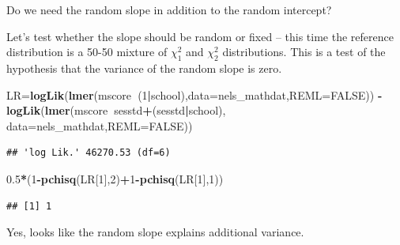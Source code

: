 \documentclass[ignorenonframetext,]{beamer}
\newenvironment{Shaded}{\begin{snugshade}}{\end{snugshade}}
\newcommand{\KeywordTok}[1]{\textcolor[rgb]{0.13,0.29,0.53}{\textbf{#1}}}
\newcommand{\DataTypeTok}[1]{\textcolor[rgb]{0.13,0.29,0.53}{#1}}
\newcommand{\DecValTok}[1]{\textcolor[rgb]{0.00,0.00,0.81}{#1}}
\newcommand{\FloatTok}[1]{\textcolor[rgb]{0.00,0.00,0.81}{#1}}
\newcommand{\OtherTok}[1]{\textcolor[rgb]{0.56,0.35,0.01}{#1}}
\newcommand{\OperatorTok}[1]{\textcolor[rgb]{0.81,0.36,0.00}{\textbf{#1}}}
\newcommand{\NormalTok}[1]{#1}
\begin{document}
\begin{frame}[fragile]{Do we need the random slope in addition to the
random intercept?}

Let's test whether the slope should be random or fixed -- this time the
reference distribution is a 50-50 mixture of \(\chi^2_1\) and
\(\chi^2_2\) distributions. This is a test of the hypothesis that the
variance of the random slope is zero.

\begin{Shaded}
\begin{Highlighting}[]
\NormalTok{LR=}\KeywordTok{logLik}\NormalTok{(}\KeywordTok{lmer}\NormalTok{(mscore}\OperatorTok{~}\NormalTok{(}\DecValTok{1}\OperatorTok{|}\NormalTok{school),}\DataTypeTok{data=}\NormalTok{nels_mathdat,}\DataTypeTok{REML=}\OtherTok{FALSE}\NormalTok{))}
 \OperatorTok{-}\KeywordTok{logLik}\NormalTok{(}\KeywordTok{lmer}\NormalTok{(mscore}\OperatorTok{~}\NormalTok{sesstd}\OperatorTok{+}\NormalTok{(sesstd}\OperatorTok{|}\NormalTok{school),}
              \DataTypeTok{data=}\NormalTok{nels_mathdat,}\DataTypeTok{REML=}\OtherTok{FALSE}\NormalTok{))}
\end{Highlighting}
\end{Shaded}

\begin{verbatim}
## 'log Lik.' 46270.53 (df=6)
\end{verbatim}

\begin{Shaded}
\begin{Highlighting}[]
\FloatTok{0.5}\OperatorTok{*}\NormalTok{(}\DecValTok{1}\OperatorTok{-}\KeywordTok{pchisq}\NormalTok{(LR[}\DecValTok{1}\NormalTok{],}\DecValTok{2}\NormalTok{)}\OperatorTok{+}\DecValTok{1}\OperatorTok{-}\KeywordTok{pchisq}\NormalTok{(LR[}\DecValTok{1}\NormalTok{],}\DecValTok{1}\NormalTok{))}
\end{Highlighting}
\end{Shaded}

\begin{verbatim}
## [1] 1
\end{verbatim}

Yes, looks like the random slope explains additional variance.

\end{frame}
\end{document}
